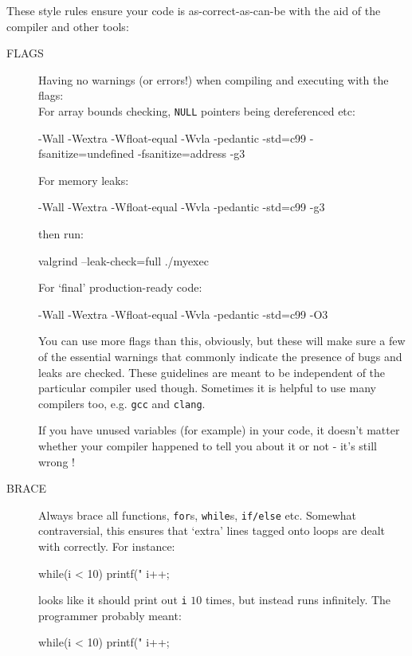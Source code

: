 
These style rules ensure your code is as-correct-as-can-be with the aid
of the compiler and other tools:
\begin{description}
\item[FLAGS] Having no warnings (or errors!) when compiling and executing with the flags:\\
For array bounds checking, \verb^NULL^ pointers being dereferenced etc:
\begin{terminaloutput}
-Wall -Wextra -Wfloat-equal -Wvla -pedantic -std=c99
-fsanitize=undefined -fsanitize=address -g3
\end{terminaloutput}
For memory leaks:
\begin{terminaloutput}
-Wall -Wextra -Wfloat-equal -Wvla -pedantic -std=c99
-g3
\end{terminaloutput}
then run:
\begin{terminaloutput}
valgrind --leak-check=full ./myexec
\end{terminaloutput}
For `final' production-ready code:
\begin{terminaloutput}
-Wall -Wextra -Wfloat-equal -Wvla -pedantic -std=c99
-O3
\end{terminaloutput}

You can use more flags than this, obviously, but these will
make sure a few of the essential warnings that commonly indicate
the presence of bugs and leaks are checked. These guidelines are meant to
be independent of the particular compiler used though. Sometimes it is helpful to use many compilers too, e.g. \verb^gcc^ and \verb^clang^.

If you have unused variables (for example) in your code, it doesn't matter whether your compiler happened to tell you about it or not - it's still wrong !

\item[BRACE] Always brace all functions, \verb^for^s, \verb^while^s, \verb^if/else^ etc.
Somewhat contraversial, this ensures that `extra' lines tagged onto loops are
dealt with correctly. For instance:
\begin{codesnippet}
while(i < 10)
   printf("%
   i++;
\end{codesnippet}
looks like it should print out \verb^i^ $10$ times, but instead runs infinitely.
The programmer probably meant:
\begin{codesnippet}
while(i < 10){
   printf("%
   i++;
}
\end{codesnippet}


\end{description}
